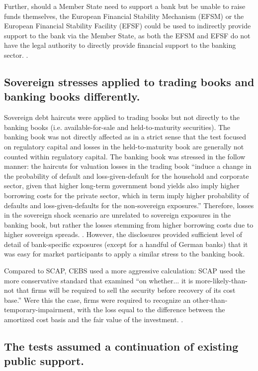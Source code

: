 \documentclass[12pt]{article}
\begin{document}
Further, should a Member State need to support a bank but be unable to raise funds themselves, the European Financial Stability Mechanism (EFSM) or the European Financial Stability Facility (EFSF) could be used to indirectly provide support to the bank via the Member State, as both the EFSM and EFSF do not have the legal authority to directly provide financial support to the banking sector. \citep{QA}.


\subsection{Sovereign stresses applied to trading books and banking books differently.}

Sovereign debt haircuts were applied to trading books but not directly to the banking books (i.e. available-for-sale and held-to-maturity securities). The banking book was not directly affected as in a strict sense that the test focused on regulatory capital and losses in the held-to-maturity book are generally not counted within regulatory capital. The banking book was stressed in the follow manner: the haircuts for valuation losses in the trading book ``induce a change in the probability of default and loss-given-default for the household and corporate sector, given that higher long-term government bond yields also imply higher borrowing costs for the private sector, which in term imply higher probability of defaults and loss-given-defaults for the non-sovereign exposures.'' Therefore, losses in the sovereign shock scenario are unrelated to sovereign exposures in the banking book, but rather the losses stemming from higher borrowing costs due to higher sovereign spreads. \citep{Samuels}. However, the disclosures provided sufficient level of detail of bank-specific exposures (except for a handful of German banks) that it was easy for market participants to apply a similar stress to the banking book.

Compared to SCAP, CEBS used a more aggressive calculation: SCAP used the more conservative standard that examined ``on whether... it is more-likely-than-not that firms will be required to sell the security before recovery of its cost base.'' Were this the case, firms were required to recognize an other-than-temporary-impairment, with the loss equal to the difference between the amortized cost basis and the fair value of the investment. \citep{SCAPResults}.

\subsection{The tests assumed a continuation of existing public support.}
\end{document}
